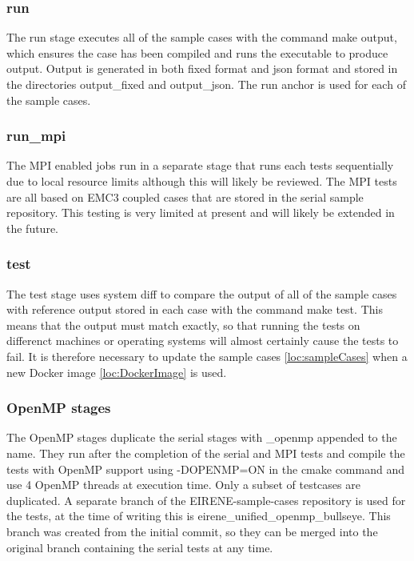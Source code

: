 \subsubsection{run}
The run stage executes all of the sample cases with the command {make output}, which ensures the case has been compiled and runs the executable to produce output. Output is generated in both fixed format and json format and stored in the directories {output\_fixed} and {output\_json}. The {run} anchor is used for each of the sample cases.

\subsubsection{run\_mpi}
The MPI enabled jobs run in a separate stage that runs each tests sequentially due to local resource limits although this will likely be reviewed. The MPI tests are all based on EMC3 coupled cases that are stored in the serial sample repository. This testing is very limited at present and will likely be extended in the future.

\subsubsection{test}
The test stage uses system {diff} to compare the output of all of the sample cases with reference output stored in each case with the command {make test}. This means that the output must match exactly, so that running the tests on differenct machines or operating systems will almost certainly cause the tests to fail. It is therefore necessary to update the sample cases \cref{loc:sampleCases} when a new Docker image \cref{loc:DockerImage} is used.


\subsubsection{OpenMP stages}
The OpenMP stages duplicate the serial stages with {\_openmp} appended to the name.  They run after the completion of the serial and MPI tests and compile the tests with OpenMP support using {-DOPENMP=ON} in the cmake command and use 4 OpenMP threads at execution time. Only a subset of testcases are duplicated. A separate branch of the {EIRENE-sample-cases} repository is used for the tests, at the time of writing this is {eirene\_unified\_openmp\_bullseye}. This branch was created from the initial commit, so they can be merged into the original branch containing the serial tests at any time.

